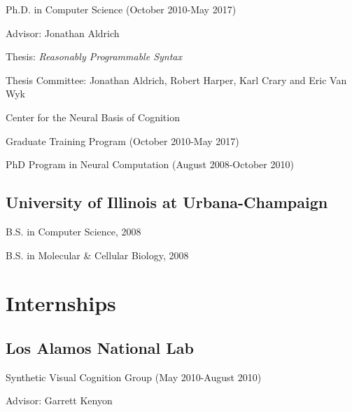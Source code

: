 \documentclass[10pt,letterpaper]{article}
\renewenvironment{itemize}{
  \begin{list}{}{
    \setlength{\leftmargin}{1.25em}
    \setlength{\itemsep}{0.25em}
    \setlength{\parskip}{0pt}
    \setlength{\parsep}{0.2em}
  }
}{
  \end{list}
}
\begin{document}
\begin{itemize}
  \item Ph.D. in Computer Science (October 2010-May 2017)
    \begin{itemize}
    \item Advisor: Jonathan Aldrich
    \item Thesis: \emph{Reasonably Programmable Syntax}
    \item Thesis Committee: Jonathan Aldrich, Robert Harper, Karl Crary and Eric Van Wyk
    \end{itemize}
  \item Center for the Neural Basis of Cognition
    \begin{itemize}
      \item Graduate Training Program (October 2010-May 2017)
      \item PhD Program in Neural Computation (August 2008-October 2010)
    \end{itemize}
\end{itemize}

\subsection*{University of Illinois at Urbana-Champaign}
\begin{itemize}
  \item B.S. in Computer Science, 2008
  \item B.S. in Molecular \& Cellular Biology, 2008
\end{itemize}


\section*{Internships}
\subsection*{Los Alamos National Lab}
  \begin{itemize}
    \item Synthetic Visual Cognition Group (May 2010-August 2010)
    \item Advisor: Garrett Kenyon
  \end{itemize}
\end{document}
